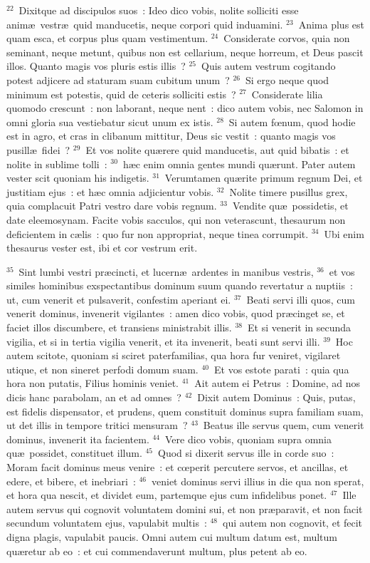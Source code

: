 ${}^{22}$~Dixitque ad discipulos suos~: Ideo dico vobis, nolite solliciti esse anim\ae\ vestr\ae\ quid manducetis, neque corpori quid induamini.
${}^{23}$~Anima plus est quam esca, et corpus plus quam vestimentum.
${}^{24}$~Considerate corvos, quia non seminant, neque metunt, quibus non est cellarium, neque horreum, et Deus pascit illos. Quanto magis vos pluris estis illis~?
${}^{25}$~Quis autem vestrum cogitando potest adjicere ad staturam suam cubitum unum~?
${}^{26}$~Si ergo neque quod minimum est potestis, quid de ceteris solliciti estis~?
${}^{27}$~Considerate lilia quomodo crescunt~: non laborant, neque nent~: dico autem vobis, nec Salomon in omni gloria sua vestiebatur sicut unum ex istis.
${}^{28}$~Si autem fœnum, quod hodie est in agro, et cras in clibanum mittitur, Deus sic vestit~: quanto magis vos pusill\ae\ fidei~?
${}^{29}$~Et vos nolite qu\ae rere quid manducetis, aut quid bibatis~: et nolite in sublime tolli~:
${}^{30}$~h\ae c enim omnia gentes mundi qu\ae runt. Pater autem vester scit quoniam his indigetis.
${}^{31}$~Verumtamen qu\ae rite primum regnum Dei, et justitiam ejus~: et h\ae c omnia adjicientur vobis.
${}^{32}$~Nolite timere pusillus grex, quia complacuit Patri vestro dare vobis regnum.
${}^{33}$~Vendite qu\ae\ possidetis, et date eleemosynam. Facite vobis sacculos, qui non veterascunt, thesaurum non deficientem in c\ae lis~: quo fur non appropriat, neque tinea corrumpit.
${}^{34}$~Ubi enim thesaurus vester est, ibi et cor vestrum erit.


${}^{35}$~Sint lumbi vestri pr\ae cincti, et lucern\ae\ ardentes in manibus vestris,
${}^{36}$~et vos similes hominibus exspectantibus dominum suum quando revertatur a nuptiis~: ut, cum venerit et pulsaverit, confestim aperiant ei.
${}^{37}$~Beati servi illi quos, cum venerit dominus, invenerit vigilantes~: amen dico vobis, quod pr\ae cinget se, et faciet illos discumbere, et transiens ministrabit illis.
${}^{38}$~Et si venerit in secunda vigilia, et si in tertia vigilia venerit, et ita invenerit, beati sunt servi illi.
${}^{39}$~Hoc autem scitote, quoniam si sciret paterfamilias, qua hora fur veniret, vigilaret utique, et non sineret perfodi domum suam.
${}^{40}$~Et vos estote parati~: quia qua hora non putatis, Filius hominis veniet.
${}^{41}$~Ait autem ei Petrus~: Domine, ad nos dicis hanc parabolam, an et ad omnes~?
${}^{42}$~Dixit autem Dominus~: Quis, putas, est fidelis dispensator, et prudens, quem constituit dominus supra familiam suam, ut det illis in tempore tritici mensuram~?
${}^{43}$~Beatus ille servus quem, cum venerit dominus, invenerit ita facientem.
${}^{44}$~Vere dico vobis, quoniam supra omnia qu\ae\ possidet, constituet illum.
${}^{45}$~Quod si dixerit servus ille in corde suo~: Moram facit dominus meus venire~: et cœperit percutere servos, et ancillas, et edere, et bibere, et inebriari~:
${}^{46}$~veniet dominus servi illius in die qua non sperat, et hora qua nescit, et dividet eum, partemque ejus cum infidelibus ponet.
${}^{47}$~Ille autem servus qui cognovit voluntatem domini sui, et non pr\ae paravit, et non facit secundum voluntatem ejus, vapulabit multis~:
${}^{48}$~qui autem non cognovit, et fecit digna plagis, vapulabit paucis. Omni autem cui multum datum est, multum qu\ae retur ab eo~: et cui commendaverunt multum, plus petent ab eo.


